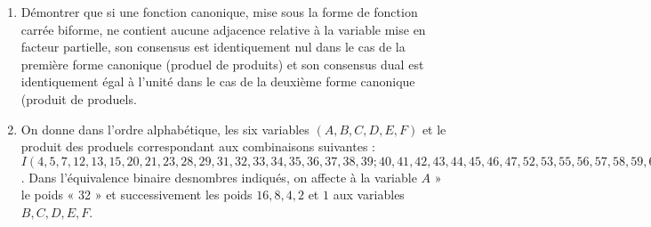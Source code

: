 \begin{enumerate} [label=\arabic*$^\circ$]
\medskip 

 
\textsl{Réponse :}

\medskip

\[ f_1 = 
\begin{array}{|c|}   A \\ \overline{B} . \overline{C} \\   \end{array}
     \text{, } \quad f_2 = \begin{array}{|c|} A \\ C \\ D \\ \end{array} 
      \text{, } \quad f_3 = \begin{array}{|c|} \overline{x_1} \\ x_3 \end{array} 
\]

\medskip 


\[ f_4 = 
\begin{array}{|c|c|}   
    x_1 & \overline{x_3} \\
    \overline{x_2} & \overline{x_1} \\	    
\end{array}
    = \begin{array}{|c|}
          x_0 . \overline{x_1} . \overline{x_2} \\ 
          x_0 . x_1 . \overline{x_3} \\
      \end{array} 
       \text{, } \quad f_5 = \begin{array}{c|c|} 
       							$\multirow{2}{*}{$A$}$ & \overline{B} \\
       							                       & C \\
                             \end{array} 
\]

\medskip 

\item Démontrer que si une fonction canonique, mise sous la forme de fonction carrée biforme, ne contient aucune adjacence relative à la variable mise en facteur partielle, son consensus est identiquement nul dans le cas de la première forme canonique (produel de produits) et son consensus dual est identiquement égal à l'unité dans le cas de la deuxième forme canonique (produit de produels. 

\item On donne dans l'ordre alphabétique, les six variables $ (A, B, C, D, E, F)$ et le produit des produels correspondant aux combinaisons suivantes : $I (4, 5, 7, 12, 13, 15, 20, 21, 23, 28, 29, 31, 32, 33, 34, 35, 36, 37, 38, 39; 40, 41, 42, 43, 44, 45, 46, 47, 52, 53, 55, 56, 57, 58, 59, 60, 61, 62, 63)$. Dans l'équivalence binaire desnombres indiqués, on affecte à la variable  $A$ » le poids  « 32 » et successivement les poids $16, 8, 4, 2$ et $1$ aux variables $B, C, D, E, F$. 


\end{enumerate}
